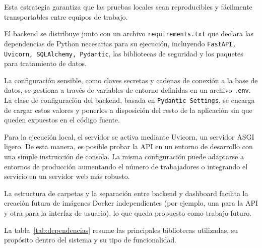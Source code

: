   Esta estrategia garantiza que las pruebas locales sean reproducibles y
  fácilmente transportables entre equipos de trabajo.

  El backend se distribuye junto con un archivo \texttt{requirements.txt} que
  declara las dependencias de Python necesarias para su ejecución, incluyendo
  \texttt{FastAPI, Uvicorn, SQLAlchemy, Pydantic}, las bibliotecas de seguridad
  y los paquetes para tratamiento de datos.

  La configuración sensible, como claves secretas y cadenas de conexión a la
  base de datos, se gestiona a través de variables de entorno definidas en un
  archivo \texttt{.env}. La clase de configuración del backend, basada en
  \texttt{Pydantic Settings}, se encarga de cargar estos valores y ponerlos a
  disposición del resto de la aplicación sin que queden expuestos en el código
  fuente.

  Para la ejecución local, el servidor se activa mediante Uvicorn, un servidor
  ASGI ligero. De esta manera, es posible probar la API en un entorno de
  desarrollo con una simple instrucción de consola. La misma configuración puede
  adaptarse a entornos de producción aumentando el número de trabajadores o
  integrando el servicio en un servidor web más robusto.

  La estructura de carpetas y la separación entre backend y dashboard facilita
  la creación futura de imágenes Docker independientes (por ejemplo, una para
  la API y otra para la interfaz de usuario), lo que queda propuesto como
  trabajo futuro.

  
La tabla~\ref{tab:dependencias} resume las principales 
bibliotecas utilizadas, su propósito dentro del sistema y su tipo de funcionalidad.

